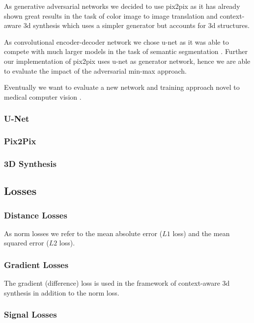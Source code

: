 As generative adversarial networks we decided to use pix2pix \cite{Isola16}
as it has already shown great results in the task of color image to image
translation and context-aware 3d synthesis \cite{Nie16} which uses a simpler
generator but accounts for 3d structures.

As convolutional encoder-decoder network we chose u-net \cite{Ronneberger15}
as it was able to compete with much larger models in the task of semantic
segmentation \cite{Badrinarayanan15}. Further our implementation of pix2pix
uses u-net as generator network, hence we are able to evaluate the impact
of the adversarial min-max approach.

Eventually we want to evaluate a new network and training approach novel to
medical computer vision \cite{Karras17}.

\subsubsection{U-Net}


\subsubsection{Pix2Pix}

\subsubsection{3D Synthesis}

\subsection{Losses}

\subsubsection{Distance Losses}

As norm losses we refer to the mean absolute error ($L1$ loss) and the
mean squared error ($L2$ loss).

\subsubsection{Gradient Losses}

The gradient (difference) loss is used in the framework of context-aware
3d synthesis \cite{Nie16} in addition to the norm loss.

\subsubsection{Signal Losses}

